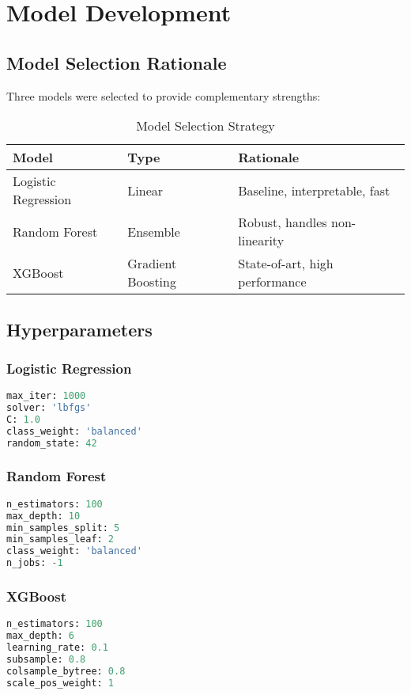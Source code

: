 \documentclass[11pt,a4paper]{article}
\begin{document}
\section{Model Development}

\subsection{Model Selection Rationale}

Three models were selected to provide complementary strengths:

\begin{table}[h]
\centering
\begin{tabular}{@{}lll@{}}
\toprule
\textbf{Model} & \textbf{Type} & \textbf{Rationale} \\ \midrule
Logistic Regression & Linear & Baseline, interpretable, fast \\
Random Forest & Ensemble & Robust, handles non-linearity \\
XGBoost & Gradient Boosting & State-of-art, high performance \\ \bottomrule
\end{tabular}
\caption{Model Selection Strategy}
\end{table}

\subsection{Hyperparameters}

\subsubsection{Logistic Regression}
\begin{lstlisting}[language=Python]
max_iter: 1000
solver: 'lbfgs'
C: 1.0
class_weight: 'balanced'
random_state: 42
\end{lstlisting}

\subsubsection{Random Forest}
\begin{lstlisting}[language=Python]
n_estimators: 100
max_depth: 10
min_samples_split: 5
min_samples_leaf: 2
class_weight: 'balanced'
n_jobs: -1
\end{lstlisting}

\subsubsection{XGBoost}
\begin{lstlisting}[language=Python]
n_estimators: 100
max_depth: 6
learning_rate: 0.1
subsample: 0.8
colsample_bytree: 0.8
scale_pos_weight: 1
\end{lstlisting}
\end{document}

